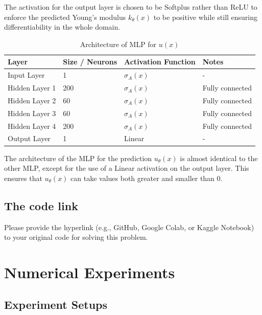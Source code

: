 The activation for the output layer is chosen to be Softplus rather than ReLU to enforce the predicted Young's modulus $k_\theta(x)$ to be positive while still ensuring differentiability in the whole domain.


\begin{table}[H]
	\centering
	\caption{Architecture of MLP for $u(x)$}
	\label{tab:problem_A_network_u}
	\begin{tabular}{llll}
		\hline
		\textbf{Layer} & \textbf{Size / Neurons} & \textbf{Activation Function} & \textbf{Notes} \\
		\hline
		Input Layer        & 1                                & $\sigma_A(x)$         & - \\
		Hidden Layer 1     & 200                              & $\sigma_A(x)$       & Fully connected \\
		Hidden Layer 2     & 60                               & $\sigma_A(x)$       & Fully connected \\
		Hidden Layer 3     & 60                               & $\sigma_A(x)$       & Fully connected \\
		Hidden Layer 4       & 200                            & $\sigma_A(x)$    & Fully connected \\
		Output Layer       & 1                              & Linear       & - \\
		\hline
	\end{tabular}
\end{table}

The architecture of the MLP for the prediction $u_\theta(x)$ is almost identical to the other MLP, except for the use of a Linear activation on the output layer. This ensures that $u_\theta(x)$ can take values both greater and smaller than 0.


%
\subsection{The code link}
{\color{blue}Please provide the hyperlink (e.g., GitHub, Google Colab, or Kaggle Notebook) to your original code for solving this problem.} 
%
\section{Numerical Experiments}
%
\subsection{Experiment Setups}
%

